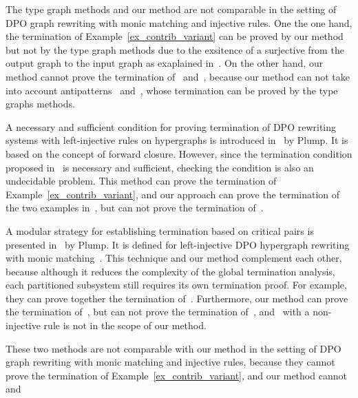 The type graph methods and our method are not comparable in the setting of DPO graph rewriting with monic matching and injective rules. One the one hand, the termination of Example~\ref{ex_contrib_variant} can be proved by our method but not by the type graph methods due to the exsitence of a surjective from the output graph to the input graph as exaplained in~\cite[Example D.4]{endrullis2024generalized_arxiv_v2}. On the other hand, our method cannot prove the termination of~\cite[Example 1, Ad-hoc Routing Protocol]{bruggink2014termination} and~\cite[Example D3]{endrullis2024generalized_arxiv_v2}, because our method can not take into account antipatterns~\cite[Remark 6.2]{overbeek2024termination_lmcs} and~\cite[Examples D1, D2 and D3]{endrullis2024generalized_arxiv_v2}, whose termination can be proved by the type graphs methods.

A necessary and sufficient condition for proving termination of DPO rewriting systems with left-injective rules on hypergraphs is introduced in~\cite{Plump1995} by Plump. It is based on the concept of forward closure. However, since the termination condition proposed in~\cite{Plump1995} is necessary and sufficient, checking the condition is also an undecidable problem. This method can prove the termination of Example~\ref{ex_contrib_variant}, and our approach can prove the termination of the two examples in~\cite{Plump1995}, but can not prove the termination of~\cite[Example 4.1]{Plump1995}.

A modular strategy for establishing termination based on critical pairs is presented in~\cite{plump2018modular} by Plump. It is defined for left-injective DPO hypergraph rewriting with monic matching~\cite[Section 2.2]{plump2018modular}. 
This technique and our method complement each other, because although it reduces the complexity of the global termination analysis, each partitioned subsystem still requires its own termination proof. For example, they can prove together the termination of~\cite[Example 4]{plump2018modular}.
Furthermore, our method can prove the termination of~\cite[Examples 1 and 5]{plump2018modular}, but can not prove the termination of~\cite[Example 4]{plump2018modular}, and~\cite[Example 6]{plump2018modular} with a non-injective rule is not in the scope of our method. 

These two methods are not comparable with our method in the setting of DPO graph rewriting with monic matching and injective rules, because they cannot prove the termination of Example~\ref{ex_contrib_variant}, and our method cannot   and

